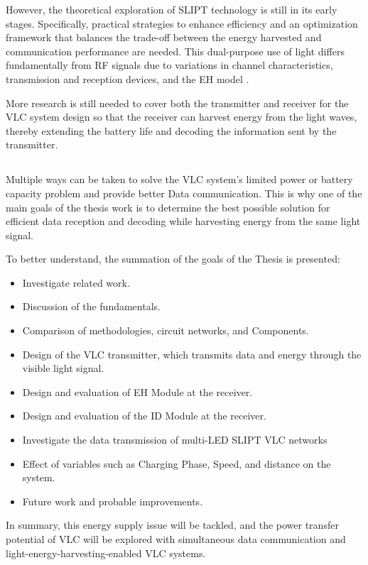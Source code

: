 However, the theoretical exploration of \ac{SLIPT} technology is still in its early stages. Specifically, practical strategies to enhance efficiency and an optimization framework that balances the trade-off between the energy harvested and communication performance are needed. This dual-purpose use of light differs fundamentally from \ac{RF} signals due to variations in channel characteristics, transmission and reception devices, and the \ac{EH} model \cite{diamantoulakis2018simultaneous}.

More research is still needed to cover both the transmitter and receiver for the \ac{VLC} system design so that the receiver can harvest energy from the light waves, thereby extending the battery life and decoding the information sent by the transmitter.



\subsection{}

Multiple ways can be taken to solve the \ac{VLC} system's limited power or battery capacity problem and provide better Data communication. This is why one of the main goals of the thesis work is to determine the best possible solution for efficient data reception and decoding while harvesting energy from the same light signal.

To better understand, the summation of the goals of the Thesis is presented:
\begin{itemize}
    \item Investigate related work.
    \item Discussion of the fundamentals.
    \item Comparison of methodologies, circuit networks, and Components.
    \item Design of the \ac{VLC} transmitter, which transmits data and energy through the visible light signal.
    \item Design and evaluation of \ac{EH} Module at the receiver.
    \item Design and evaluation of the \ac{ID} Module at the receiver.
    \item Investigate the data transmission of multi-LED \ac{SLIPT} \ac{VLC} networks
    \item Effect of variables such as Charging Phase, Speed, and distance on the system. 
    \item Future work and probable improvements.
    
\end{itemize}

In summary, this energy supply issue will be tackled, and the power transfer potential of \ac{VLC} will be explored with simultaneous data communication and light-energy-harvesting-enabled \ac{VLC} systems.
